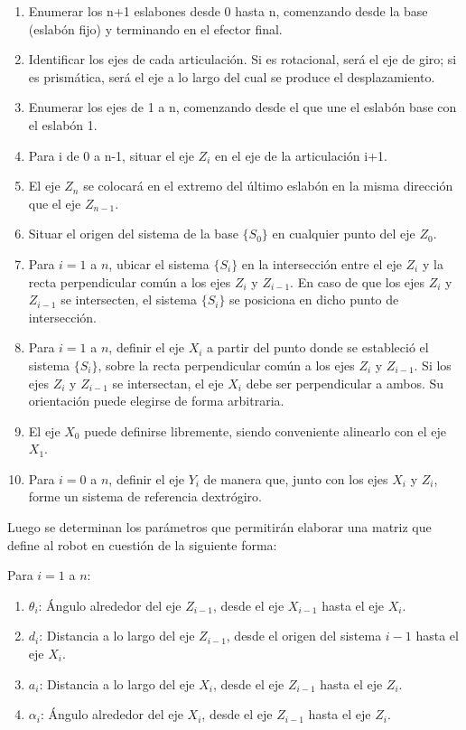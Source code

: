 \documentclass{article}
\begin{document}
\begin{enumerate}
    \item Enumerar los n+1 eslabones desde 0 hasta n, comenzando desde la base (eslabón fijo) y terminando en el efector final.
    \item Identificar los ejes de cada articulación. Si es rotacional, será el eje de giro; si es prismática, será el eje a lo largo del cual se produce el desplazamiento.
    \item Enumerar los ejes de 1 a n, comenzando desde el que une el eslabón base con el eslabón 1.
    \item Para i de 0 a n-1, situar el eje $Z_i$ en el eje de la articulación i+1.
    \item El eje $Z_n$ se colocará en el extremo del último eslabón en la misma dirección que el eje $Z_{n-1}$.
    \item Situar el origen del sistema de la base $\{S_0\}$ en cualquier punto del eje $Z_0$.
    \item Para $i = 1$ a $n$, ubicar el sistema $\{S_i\}$ en la intersección entre el eje $Z_i$ y la recta perpendicular común a los ejes $Z_i$ y $Z_{i-1}$. En caso de que los ejes $Z_i$ y $Z_{i-1}$ se intersecten, el sistema $\{S_i\}$ se posiciona en dicho punto de intersección.
    \item Para $i = 1$ a $n$, definir el eje $X_i$ a partir del punto donde se estableció el sistema $\{S_i\}$, sobre la recta perpendicular común a los ejes $Z_i$ y $Z_{i-1}$. Si los ejes $Z_i$ y $Z_{i-1}$ se intersectan, el eje $X_i$ debe ser perpendicular a ambos. Su orientación puede elegirse de forma arbitraria.
    \item El eje $X_0$ puede definirse libremente, siendo conveniente alinearlo con el eje $X_1$.
    \item Para $i = 0$ a $n$, definir el eje $Y_i$ de manera que, junto con los ejes $X_i$ y $Z_i$, forme un sistema de referencia dextrógiro.
    
\end{enumerate}

Luego se determinan los parámetros que permitirán elaborar una matriz que define al robot en cuestión de la siguiente forma:

Para $i = 1$ a $n$:

\begin{enumerate}
    \item $\theta_i$: Ángulo alrededor del eje $Z_{i-1}$, desde el eje $X_{i-1}$ hasta el eje $X_i$.
    
    \item $d_i$: Distancia a lo largo del eje $Z_{i-1}$, desde el origen del sistema $i-1$ hasta el eje $X_i$.
    
    \item $a_i$: Distancia a lo largo del eje $X_i$, desde el eje $Z_{i-1}$ hasta el eje $Z_i$.
    
    \item $\alpha_i$: Ángulo alrededor del eje $X_i$, desde el eje $Z_{i-1}$ hasta el eje $Z_i$.
\end{enumerate}
\end{document}
